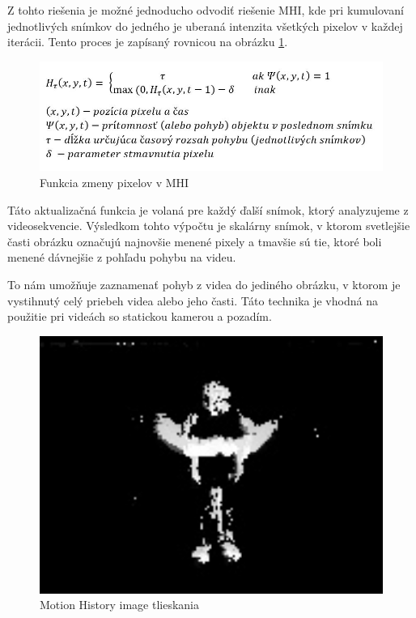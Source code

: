 Z tohto riešenia je možné jednoducho odvodiť riešenie MHI, kde pri kumulovaní jednotlivých snímkov do jedného je uberaná intenzita všetkých pixelov v každej iterácii. Tento proces je zapísaný rovnicou na obrázku \ref{MHIeq}.

\begin{figure}[H]
  \centering
  \includegraphics[width=14cm]{img/MHIeq.jpg}
  \caption{Funkcia zmeny pixelov v MHI}
  \label{MHIeq}
\end{figure}

Táto aktualizačná funkcia je volaná pre každý ďalší snímok, ktorý analyzujeme z videosekvencie. Výsledkom tohto výpočtu je skalárny snímok, v ktorom svetlejšie časti obrázku označujú najnovšie menené pixely a tmavšie sú tie, ktoré boli menené dávnejšie z pohľadu pohybu na videu.

To nám umožňuje zaznamenať pohyb z videa do jediného obrázku, v ktorom je vystihnutý celý priebeh videa alebo jeho časti. Táto technika je vhodná na použitie pri videách so statickou kamerou a pozadím.\cite{c10}

\begin{figure}[H]
  \centering
  \includegraphics[width=13cm]{img/MHIclap.jpg}
  \caption{Motion History image tlieskania}
  \label{MHIclap}
\end{figure}

